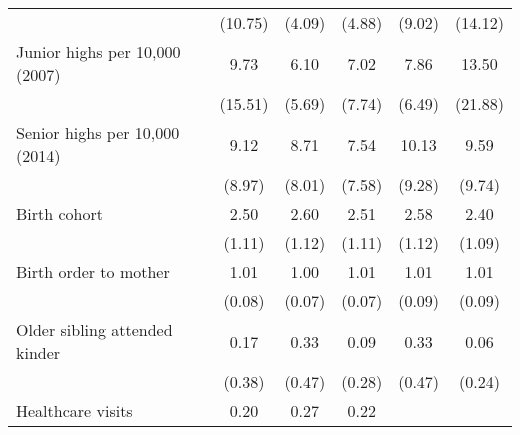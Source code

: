 \begin{tabular}{llllll}
\multicolumn{1}{l}{} &
  \multicolumn{1}{|c}{(10.75)} &
  \multicolumn{1}{c}{(4.09)} &
  \multicolumn{1}{c}{(4.88)} &
  \multicolumn{1}{c}{(9.02)} &
  \multicolumn{1}{c}{(14.12)} \\
\multicolumn{1}{l}{Junior highs per 10,000 (2007)} &
  \multicolumn{1}{|c}{9.73} &
  \multicolumn{1}{c}{6.10} &
  \multicolumn{1}{c}{7.02} &
  \multicolumn{1}{c}{7.86} &
  \multicolumn{1}{c}{13.50} \\
\multicolumn{1}{l}{} &
  \multicolumn{1}{|c}{(15.51)} &
  \multicolumn{1}{c}{(5.69)} &
  \multicolumn{1}{c}{(7.74)} &
  \multicolumn{1}{c}{(6.49)} &
  \multicolumn{1}{c}{(21.88)} \\
\multicolumn{1}{l}{Senior highs per 10,000 (2014)} &
  \multicolumn{1}{|c}{9.12} &
  \multicolumn{1}{c}{8.71} &
  \multicolumn{1}{c}{7.54} &
  \multicolumn{1}{c}{10.13} &
  \multicolumn{1}{c}{9.59} \\
\multicolumn{1}{l}{} &
  \multicolumn{1}{|c}{(8.97)} &
  \multicolumn{1}{c}{(8.01)} &
  \multicolumn{1}{c}{(7.58)} &
  \multicolumn{1}{c}{(9.28)} &
  \multicolumn{1}{c}{(9.74)} \\
\multicolumn{1}{l}{Birth cohort} &
  \multicolumn{1}{|c}{2.50} &
  \multicolumn{1}{c}{2.60} &
  \multicolumn{1}{c}{2.51} &
  \multicolumn{1}{c}{2.58} &
  \multicolumn{1}{c}{2.40} \\
\multicolumn{1}{l}{} &
  \multicolumn{1}{|c}{(1.11)} &
  \multicolumn{1}{c}{(1.12)} &
  \multicolumn{1}{c}{(1.11)} &
  \multicolumn{1}{c}{(1.12)} &
  \multicolumn{1}{c}{(1.09)} \\
\multicolumn{1}{l}{Birth order to mother} &
  \multicolumn{1}{|c}{1.01} &
  \multicolumn{1}{c}{1.00} &
  \multicolumn{1}{c}{1.01} &
  \multicolumn{1}{c}{1.01} &
  \multicolumn{1}{c}{1.01} \\
\multicolumn{1}{l}{} &
  \multicolumn{1}{|c}{(0.08)} &
  \multicolumn{1}{c}{(0.07)} &
  \multicolumn{1}{c}{(0.07)} &
  \multicolumn{1}{c}{(0.09)} &
  \multicolumn{1}{c}{(0.09)} \\
\multicolumn{1}{l}{Older sibling attended kinder} &
  \multicolumn{1}{|c}{0.17} &
  \multicolumn{1}{c}{0.33} &
  \multicolumn{1}{c}{0.09} &
  \multicolumn{1}{c}{0.33} &
  \multicolumn{1}{c}{0.06} \\
\multicolumn{1}{l}{} &
  \multicolumn{1}{|c}{(0.38)} &
  \multicolumn{1}{c}{(0.47)} &
  \multicolumn{1}{c}{(0.28)} &
  \multicolumn{1}{c}{(0.47)} &
  \multicolumn{1}{c}{(0.24)} \\
\multicolumn{1}{l}{Healthcare visits} &
  \multicolumn{1}{|c}{0.20} &
  \multicolumn{1}{c}{0.27} &
  \multicolumn{1}{c}{0.22} &

\end{tabular}
